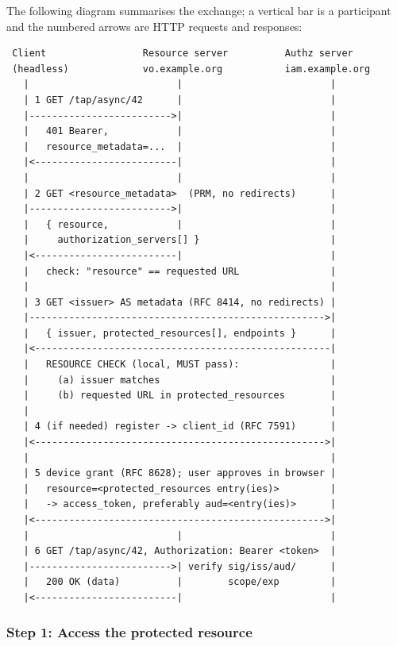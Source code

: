 \documentclass[11pt,a4paper]{ivoa}
\begin{document}
The following diagram summarises the exchange; a vertical bar is a participant
and the numbered arrows are HTTP requests and responses:

\begin{verbatim}
 Client                 Resource server          Authz server
 (headless)             vo.example.org           iam.example.org
   |                          |                          |
   | 1 GET /tap/async/42      |                          |
   |------------------------->|                          |
   |   401 Bearer,            |                          |
   |   resource_metadata=...  |                          |
   |<-------------------------|                          |
   |                          |                          |
   | 2 GET <resource_metadata>  (PRM, no redirects)      |
   |------------------------->|                          |
   |   { resource,            |                          |
   |     authorization_servers[] }                       |
   |<-------------------------|                          |
   |   check: "resource" == requested URL                |
   |                                                     |
   | 3 GET <issuer> AS metadata (RFC 8414, no redirects) |
   |---------------------------------------------------->|
   |   { issuer, protected_resources[], endpoints }      |
   |<----------------------------------------------------|
   |   RESOURCE CHECK (local, MUST pass):                |
   |     (a) issuer matches                              |
   |     (b) requested URL in protected_resources        |
   |                                                     |
   | 4 (if needed) register -> client_id (RFC 7591)      |
   |<--------------------------------------------------->|
   |                                                     |
   | 5 device grant (RFC 8628); user approves in browser |
   |   resource=<protected_resources entry(ies)>         |
   |   -> access_token, preferably aud=<entry(ies)>      |
   |<--------------------------------------------------->|
   |                          |                          |
   | 6 GET /tap/async/42, Authorization: Bearer <token>  |
   |------------------------->| verify sig/iss/aud/      |
   |   200 OK (data)          |        scope/exp         |
   |<-------------------------|                          |
\end{verbatim}

\subsubsection{Step 1: Access the protected resource}
\end{document}
